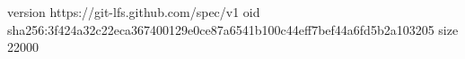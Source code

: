 version https://git-lfs.github.com/spec/v1
oid sha256:3f424a32c22eca367400129e0ce87a6541b100c44eff7bef44a6fd5b2a103205
size 22000
